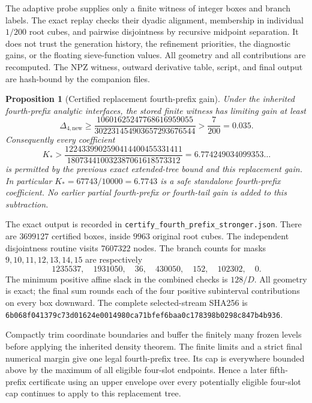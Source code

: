 \documentclass[11pt]{article}
\newtheorem{proposition}[theorem]{Proposition}
\begin{document}
The adaptive probe supplies only a finite witness of integer boxes
and branch labels.  The exact replay checks their dyadic alignment,
membership in individual $1/200$ root cubes, and pairwise disjointness
by recursive midpoint separation.  It does not trust the generation
history, the refinement priorities, the diagnostic gains, or the
floating sieve-function values.  All geometry and all contributions
are recomputed.  The NPZ witness, outward derivative table, script,
and final output are hash-bound by the companion files.

\begin{proposition}[Certified replacement fourth-prefix gain]
\label{prop:fourth-prefix-stronger-certificate}
Under the inherited fourth-prefix analytic interfaces, the stored
finite witness has limiting gain at least
\begin{equation}\label{eq:fourth-stronger-exact-gain}
 \Delta_{4,\mathrm{new}}\ge
 \frac{10601625247768616959055}{302231454903657293676544}
 >\frac7{200}=0.035.
\end{equation}
Consequently every coefficient
\[
 K_*>
 \frac{1224339902590414400455331411}
      {180734410032387061618573312}
 =6.774249034099353\ldots
\]
is permitted by the previous exact extended-tree bound and this
replacement gain.  In particular $K_*=67743/10000=6.7743$ is a
safe standalone fourth-prefix coefficient.  No earlier partial
fourth-prefix or fourth-tail gain is added to this subtraction.
\end{proposition}

The exact output is recorded in
\texttt{certify\_fourth\_prefix\_stronger.json}.
There are $3699127$ certified boxes, inside $9963$ original root
cubes.  The independent disjointness routine visits $7607322$ nodes.
The branch counts for masks $9,10,11,12,13,14,15$ are respectively
\[
 1235537,\quad1931050,\quad36,\quad430050,\quad152,\quad102302,\quad0.
\]
The minimum positive affine slack in the combined checks is $128/D$.
All geometry is exact; the final sum rounds each of the four positive
subinterval contributions on every box downward.  The complete
selected-stream SHA256 is
\texttt{6b068f041379c73d01624e0014980ca71bfef6baa0c178398b0298c847b4b936}.

Compactly trim
coordinate boundaries and buffer the finitely many frozen levels
before applying the inherited density theorem.  The finite limits
and a strict final numerical margin give one legal fourth-prefix
tree.  Its cap is everywhere bounded above by the maximum of all
eligible four-slot endpoints.  Hence a later fifth-prefix certificate
using an upper envelope over every potentially eligible four-slot
cap continues to apply to this replacement tree.
\end{document}

